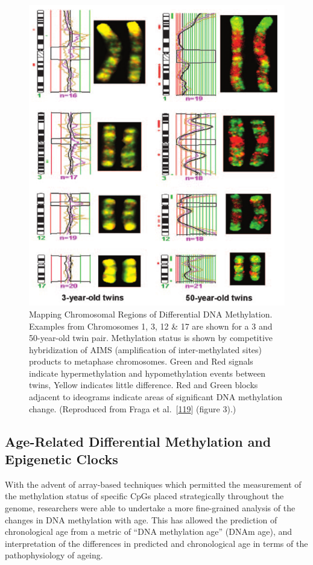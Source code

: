 \documentclass[
]{book}
\begin{document}
\begin{figure}

{\centering \includegraphics[width=0.8\linewidth]{figs/Fraga2005fig3} 

}

\caption{Mapping Chromosomal Regions of Differential DNA Methylation. Examples from Chromosomes 1, 3, 12 \& 17 are shown for a 3 and 50-year-old twin pair. Methylation status is shown by competitive hybridization of AIMS (amplification of inter-methylated sites) products to metaphase chromosomes. Green and Red signals indicate hypermethylation and hypomethylation events between twins, Yellow indicates little difference. Red and Green blocks adjacent to ideograms indicate areas of significant DNA methylation change. (Reproduced from Fraga et al.~{[}\protect\hyperlink{ref-Fraga2005}{119}{]} (figure 3).)}\label{fig:Fraga2005fig3}
\end{figure}



\hypertarget{DNAmAgeReview}{%
\subsection{Age-Related Differential Methylation and Epigenetic Clocks}\label{DNAmAgeReview}}

With the advent of array-based techniques which permitted the measurement of the methylation status of specific CpGs placed strategically throughout the genome, researchers were able to undertake a more fine-grained analysis of the changes in DNA methylation with age.
This has allowed the prediction of chronological age from a metric of ``DNA methylation age'' (DNAm age), and interpretation of the differences in predicted and chronological age in terms of the pathophysiology of ageing.
\end{document}
